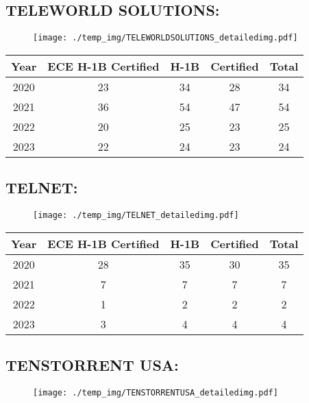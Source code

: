 \documentclass{article}%
\begin{document}
%
\newpage%
\subsection{TELEWORLD SOLUTIONS:}%
\label{subsec:TELEWORLDSOLUTIONS}%
\label{TELEWORLDSOLUTIONSdetailed}%


\begin{figure}[htbp]%
\centering%
\texttt{[image: ./temp\_img/TELEWORLDSOLUTIONS\_detailedimg.pdf]}%
\end{figure}

%
\begin{longtable}{c|c|c|c|c}%
\hline%
Year&ECE H{-}1B Certified&H{-}1B&Certified&Total\\%
\hline%
2020&23&34&28&34\\%
\hline%
2021&36&54&47&54\\%
\hline%
2022&20&25&23&25\\%
\hline%
2023&22&24&23&24\\%
\hline%
\end{longtable}

%
\newpage%
\subsection{TELNET:}%
\label{subsec:TELNET}%
\label{TELNETdetailed}%


\begin{figure}[htbp]%
\centering%
\texttt{[image: ./temp\_img/TELNET\_detailedimg.pdf]}%
\end{figure}

%
\begin{longtable}{c|c|c|c|c}%
\hline%
Year&ECE H{-}1B Certified&H{-}1B&Certified&Total\\%
\hline%
2020&28&35&30&35\\%
\hline%
2021&7&7&7&7\\%
\hline%
2022&1&2&2&2\\%
\hline%
2023&3&4&4&4\\%
\hline%
\end{longtable}

%
\newpage%
\subsection{TENSTORRENT USA:}%
\label{subsec:TENSTORRENTUSA}%
\label{TENSTORRENTUSAdetailed}%


\begin{figure}[htbp]%
\centering%
\texttt{[image: ./temp\_img/TENSTORRENTUSA\_detailedimg.pdf]}%
\end{figure}
\end{document}
